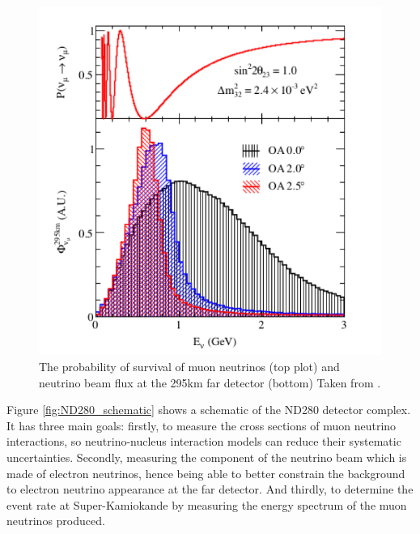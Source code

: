 \begin{figure}
    \includegraphics[width=\textwidth]{Figures/nuprobosc.png}
    \caption{The probability of survival of muon neutrinos (top plot) and neutrino beam flux at the 295km far detector (bottom) Taken from \cite{t2kcollaborationT2KNeutrinoFlux2013}.}
    \label{fig:nuprobosc}
\end{figure}

Figure \ref{fig:ND280_schematic} shows a schematic of the ND280 detector complex. It has three main goals: firstly, to measure the cross sections of muon neutrino interactions, so neutrino-nucleus interaction models can reduce their systematic uncertainties. Secondly, measuring the component of the neutrino beam which is made of electron neutrinos, hence being able to better constrain the background to electron neutrino appearance at the far detector. And thirdly, to determine the event rate at Super-Kamiokande by measuring the energy spectrum of the muon neutrinos produced. 

